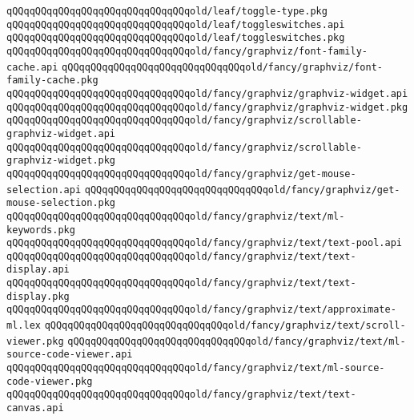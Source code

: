 \verb|qQQqqQQqqQQqqQQqqQQqqQQqqQQqqQQqold/leaf/toggle-type.pkg|\newline
\verb|qQQqqQQqqQQqqQQqqQQqqQQqqQQqqQQqold/leaf/toggleswitches.api|\newline
\verb|qQQqqQQqqQQqqQQqqQQqqQQqqQQqqQQqold/leaf/toggleswitches.pkg|\newline
\newline
\verb|qQQqqQQqqQQqqQQqqQQqqQQqqQQqqQQqold/fancy/graphviz/font-family-cache.api|\newline
\verb|qQQqqQQqqQQqqQQqqQQqqQQqqQQqqQQqold/fancy/graphviz/font-family-cache.pkg|\newline
\verb|qQQqqQQqqQQqqQQqqQQqqQQqqQQqqQQqold/fancy/graphviz/graphviz-widget.api|\newline
\verb|qQQqqQQqqQQqqQQqqQQqqQQqqQQqqQQqold/fancy/graphviz/graphviz-widget.pkg|\newline
\verb|qQQqqQQqqQQqqQQqqQQqqQQqqQQqqQQqold/fancy/graphviz/scrollable-graphviz-widget.api|\newline
\verb|qQQqqQQqqQQqqQQqqQQqqQQqqQQqqQQqold/fancy/graphviz/scrollable-graphviz-widget.pkg|\newline
\verb|qQQqqQQqqQQqqQQqqQQqqQQqqQQqqQQqold/fancy/graphviz/get-mouse-selection.api|\newline
\verb|qQQqqQQqqQQqqQQqqQQqqQQqqQQqqQQqold/fancy/graphviz/get-mouse-selection.pkg|\newline
\newline
\verb|qQQqqQQqqQQqqQQqqQQqqQQqqQQqqQQqold/fancy/graphviz/text/ml-keywords.pkg|\newline
\verb|qQQqqQQqqQQqqQQqqQQqqQQqqQQqqQQqold/fancy/graphviz/text/text-pool.api|\newline
\verb|qQQqqQQqqQQqqQQqqQQqqQQqqQQqqQQqold/fancy/graphviz/text/text-display.api|\newline
\verb|qQQqqQQqqQQqqQQqqQQqqQQqqQQqqQQqold/fancy/graphviz/text/text-display.pkg|\newline
\verb|qQQqqQQqqQQqqQQqqQQqqQQqqQQqqQQqold/fancy/graphviz/text/approximate-ml.lex|\newline
\verb|qQQqqQQqqQQqqQQqqQQqqQQqqQQqqQQqold/fancy/graphviz/text/scroll-viewer.pkg|\newline
\verb|qQQqqQQqqQQqqQQqqQQqqQQqqQQqqQQqold/fancy/graphviz/text/ml-source-code-viewer.api|\newline
\verb|qQQqqQQqqQQqqQQqqQQqqQQqqQQqqQQqold/fancy/graphviz/text/ml-source-code-viewer.pkg|\newline
\verb|qQQqqQQqqQQqqQQqqQQqqQQqqQQqqQQqold/fancy/graphviz/text/text-canvas.api|\newline
